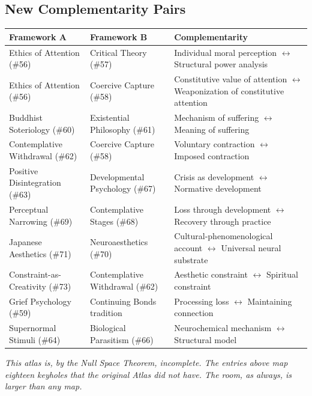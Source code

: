 \subsection*{New Complementarity Pairs}



\begin{longtable}{p{} p{} p{}}
\toprule
\textbf{Framework A} & \textbf{Framework B} & \textbf{Complementarity} \\
\midrule
\endhead
Ethics of Attention (\#56) & Critical Theory (\#57) & Individual moral perception $\leftrightarrow$ Structural power analysis \\
Ethics of Attention (\#56) & Coercive Capture (\#58) & Constitutive value of attention $\leftrightarrow$ Weaponization of constitutive attention \\
Buddhist Soteriology (\#60) & Existential Philosophy (\#61) & Mechanism of suffering $\leftrightarrow$ Meaning of suffering \\
Contemplative Withdrawal (\#62) & Coercive Capture (\#58) & Voluntary contraction $\leftrightarrow$ Imposed contraction \\
Positive Disintegration (\#63) & Developmental Psychology (\#67) & Crisis as development $\leftrightarrow$ Normative development \\
Perceptual Narrowing (\#69) & Contemplative Stages (\#68) & Loss through development $\leftrightarrow$ Recovery through practice \\
Japanese Aesthetics (\#71) & Neuroaesthetics (\#70) & Cultural-phenomenological account $\leftrightarrow$ Universal neural substrate \\
Constraint-as-Creativity (\#73) & Contemplative Withdrawal (\#62) & Aesthetic constraint $\leftrightarrow$ Spiritual constraint \\
Grief Psychology (\#59) & Continuing Bonds tradition & Processing loss $\leftrightarrow$ Maintaining connection \\
Supernormal Stimuli (\#64) & Biological Parasitism (\#66) & Neurochemical mechanism $\leftrightarrow$ Structural model \\
\bottomrule
\end{longtable}



\bigskip\noindent\makebox[\textwidth]{\color{rulegray}\rule{5cm}{0.3pt}}\bigskip


\textit{This atlas is, by the Null Space Theorem, incomplete. The entries above map eighteen keyholes that the original Atlas did not have. The room, as always, is larger than any map.}


